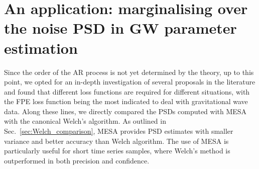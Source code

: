 \documentclass{aa}
\begin{document}
\section{An application: marginalising over the noise PSD in GW parameter estimation} \label{sec:applications}
Since the order of the AR process is not yet determined by the theory, up to this point, we opted for an in-depth investigation of several proposals in the literature and found that different loss functions are required for different situations, with the FPE loss function being the most indicated to deal with gravitational wave data. Along these lines, we directly compared the PSDs computed with MESA with the canonical Welch's algorithm. As outlined in Sec.~\ref{sec:Welch_comparison}, MESA provides PSD estimates with smaller variance and better accuracy than Welch algorithm.
The use of MESA is particularly useful for short time series samples, where Welch's method is outperformed in both precision and confidence.
 
\end{document}
